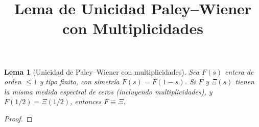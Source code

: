 \documentclass[12pt]{article}
\newtheorem{lemma}{Lema}
\begin{document}
\title{Lema de Unicidad Paley--Wiener con Multiplicidades}
\author{}
\date{}
\maketitle

\begin{lemma}[Unicidad de Paley--Wiener con multiplicidades]
Sea $F(s)$ entera de orden $\le 1$ y tipo finito, con simetría $F(s)=F(1-s)$.
Si $F$ y $\Xi(s)$ tienen la misma medida espectral de ceros (incluyendo multiplicidades),
y $F(1/2)=\Xi(1/2)$, entonces $F \equiv \Xi$.
\end{lemma}

\begin{proof}
\end{proof}
\end{document}
